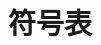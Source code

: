 \chapter*{符号表}

\newcommand{\pg}[1]{p.~\pageref{#1}}
\newcommand{\symbolindex}[2]{\hbox{\makebox[0.2\textwidth][s]{#1\hfill}\hspace*{2.5em}\parbox[t]{0.65\textwidth}{#2\hfill}}\\[1.5pt]}


{\OPTindexfont %

}
